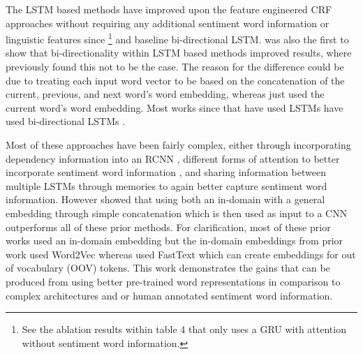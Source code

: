 The LSTM based methods have improved upon the feature engineered CRF approaches without requiring any additional sentiment word information or linguistic features since \citet{wang2017coupled}\footnote{See the ablation results within table 4 that only uses a GRU with attention without sentiment word information.} and \citet{li-lam-2017-deep} baseline bi-directional LSTM. \citet{li-lam-2017-deep} was also the first to show that bi-directionality within LSTM based methods improved results, where previously \citet{liu-etal-2015-fine} found this not to be the case. The reason for the difference could be due to \citet{liu-etal-2015-fine} treating each input word vector to be based on the concatenation of the current, previous, and next word's word embedding, whereas \citet{li-lam-2017-deep} just used the current word's word embedding. Most works since \citet{li-lam-2017-deep} that have used LSTMs have used bi-directional LSTMs \citep{li2018aspect}.

Most of these approaches have been fairly complex, either through incorporating dependency information into an RCNN \citep{wang-etal-2016-recursive}, different forms of attention to better incorporate sentiment word information \citep{wang2017coupled, li2018aspect}, and sharing information between multiple LSTMs through memories \citep{li-lam-2017-deep} to again better capture sentiment word information. However \citet{xu-etal-2018-double} showed that using both an in-domain with a general embedding through simple concatenation which is then used as input to a CNN outperforms all of these prior methods. For clarification, most of these prior works used an in-domain embedding \citep{wang-etal-2016-recursive, wang2017coupled, li-lam-2017-deep} but the in-domain embeddings from prior work used Word2Vec \citep{mikolov2013distributed} whereas \citet{xu-etal-2018-double} used FastText \citep{bojanowski-etal-2017-enriching} which can create embeddings for out of vocabulary (OOV) tokens. This work demonstrates the gains that can be produced from using better pre-trained word representations in comparison to complex architectures and or human annotated sentiment word information.

